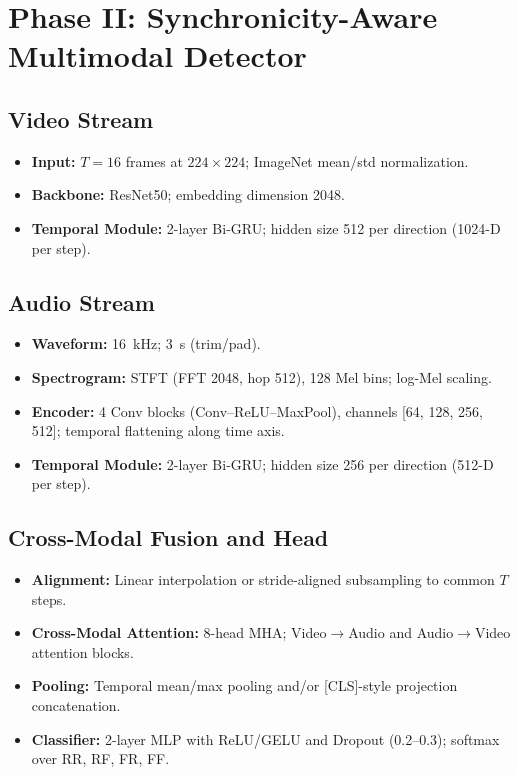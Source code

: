 \section{Phase II: Synchronicity-Aware Multimodal Detector}
\subsection{Video Stream}
\begin{itemize}
    \item \textbf{Input:} $T=16$ frames at $224\times224$; ImageNet mean/std normalization.
    \item \textbf{Backbone:} ResNet50; embedding dimension 2048.
    \item \textbf{Temporal Module:} 2-layer Bi-GRU; hidden size 512 per direction (1024-D per step).
\end{itemize}

\subsection{Audio Stream}
\begin{itemize}
    \item \textbf{Waveform:} 16~kHz; 3~s (trim/pad).
    \item \textbf{Spectrogram:} STFT (FFT 2048, hop 512), 128 Mel bins; log-Mel scaling.
    \item \textbf{Encoder:} 4 Conv blocks (Conv–ReLU–MaxPool), channels [64, 128, 256, 512]; temporal flattening along time axis.
    \item \textbf{Temporal Module:} 2-layer Bi-GRU; hidden size 256 per direction (512-D per step).
\end{itemize}

\subsection{Cross-Modal Fusion and Head}
\begin{itemize}
    \item \textbf{Alignment:} Linear interpolation or stride-aligned subsampling to common $T$ steps.
    \item \textbf{Cross-Modal Attention:} 8-head MHA; Video$\rightarrow$Audio and Audio$\rightarrow$Video attention blocks.
    \item \textbf{Pooling:} Temporal mean/max pooling and/or [CLS]-style projection concatenation.
    \item \textbf{Classifier:} 2-layer MLP with ReLU/GELU and Dropout (0.2–0.3); softmax over {RR, RF, FR, FF}.
\end{itemize}

